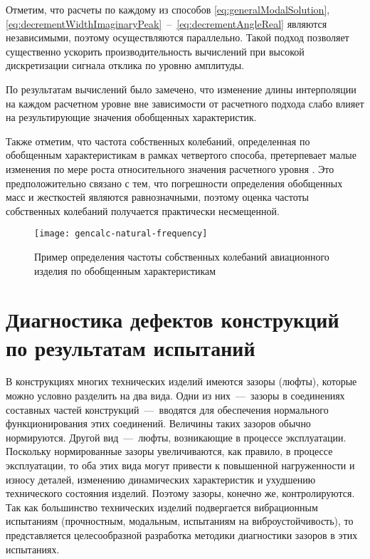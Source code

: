 Отметим, что расчеты по каждому из способов \eqref{eq:generalModalSolution}, \eqref{eq:decrementWidthImaginaryPeak}~--~\eqref{eq:decrementAngleReal} являются независимыми, поэтому осуществляются параллельно. Такой подход позволяет существенно ускорить производительность вычислений при высокой дискретизации сигнала отклика по уровню амплитуды.

По результатам вычислений было замечено, что изменение длины интерполяции на каждом расчетном уровне вне зависимости от расчетного подхода слабо влияет на результирующие значения обобщенных характеристик.

Также отметим, что частота собственных колебаний, определенная по обобщенным характеристикам в рамках четвертого способа, претерпевает малые изменения по мере роста относительного значения расчетного уровня . Это предположительно связано с тем, что погрешности определения обобщенных масс и жесткостей являются равнозначными, поэтому оценка частоты собственных колебаний получается практически несмещенной.

\begin{figure}[!htb]
	\centering
	\texttt{[image: gencalc-natural-frequency]}
	\caption{Пример определения частоты собственных колебаний авиационного изделия по обобщенным характеристикам} \label{fig:gencalc-natural-frequency}
\end{figure}

\section{Диагностика дефектов конструкций по результатам испытаний}

В конструкциях многих технических изделий имеются зазоры (люфты), которые можно условно разделить на два вида. Одни из них~---~зазоры в соединениях составных частей конструкций~---~вводятся для обеспечения нормального функционирования этих соединений. Величины таких зазоров обычно нормируются. Другой вид~---~люфты, возникающие в процессе эксплуатации. Поскольку нормированные зазоры увеличиваются, как правило, в процессе эксплуатации, то оба этих вида могут привести к повышенной нагруженности и износу деталей, изменению динамических характеристик и ухудшению технического состояния изделий. Поэтому зазоры, конечно же, контролируются. Так как большинство технических изделий подвергается вибрационным испытаниям (прочностным, модальным, испытаниям на виброустойчивость), то представляется целесообразной разработка методики диагностики зазоров в этих испытаниях. 

